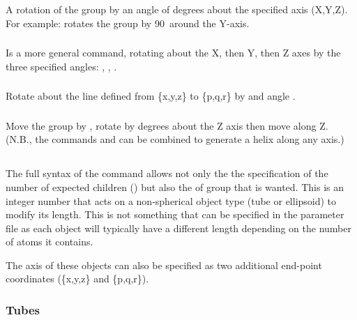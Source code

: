 A rotation of the group by an angle of  degrees about the specified axis
(X,Y,Z).  For example:  rotates the group by 90\dgr\ around the Y-axis. 

\subsubsection{}

Is a more general  command, rotating about the X, then Y, then Z axes by the three
specified angles: , , .

\subsubsection{}

Rotate about the line defined from \{x,y,z\} to \{p,q,r\} by and angle .

\subsubsection{}

Move the group by , rotate by  degrees about the Z axis then move 
along Z.    (N.B., the commands  and  can be combined to generate a helix
along any axis.)

\subsection{}

The full syntax of the  command allows not only the the specification of the number
of expected children () but also the  of group that is wanted.   This is an
integer number that acts on a non-spherical object type (tube or ellipsoid) to modify its length.  
This is not something that can  be specified in the parameter file as each object will typically
have a different length depending on the number of atoms it contains.

The axis of these objects can also be specified as two additional end-point coordinates
(\{x,y,z\} and \{p,q,r\}).

\subsubsection{Tubes}

